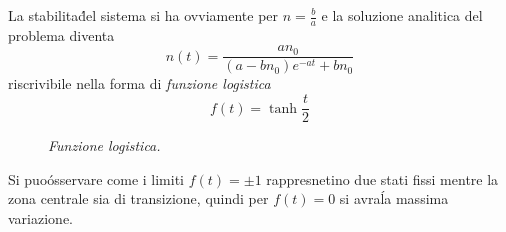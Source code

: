 \documentclass[12pt, a4paper]{book}
\theoremstyle{theorem}
\begin{document}
				La stabilita\' del sistema si ha ovviamente per $n=\frac{b}{a}$ e la soluzione analitica del problema diventa
				\begin{equation*}
					n(t)=\frac{an_{0}}{\left(a-bn_{0}\right)e^{-at}+bn_{0}}
				\end{equation*}
				riscrivibile nella forma di \emph{funzione logistica}
				\begin{equation}
					f(t)=\tanh\frac{t}{2}
					\label{equation:funzione_logistica}
				\end{equation}
				\begin{figure}[H]
					\centering
					\caption{\emph{Funzione logistica.}}
					\label{figure:funzione_logistica}
				\end{figure}
				Si puo\' osservare come i limiti $f(t)=\pm 1$ rappresnetino due stati fissi mentre la zona centrale sia di transizione, quindi per $f(t)=0$ si avra\' la massima variazione.
\end{document}
